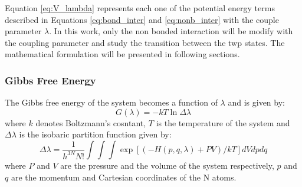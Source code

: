 Equation \ref{eq:V_lambda} represents each one of the potential energy terms described in Equations \ref{eq:bond_inter} and \ref{eq:nonb_inter} with the couple parameter $\lambda$.
In this work, only the non bonded interaction will be modify with the coupling parameter and study the transition between the twp states. The mathematical formulation will be presented in following sections. 

\subsubsection{Gibbs Free Energy}

The Gibbs free energy of the system becomes a function of $\lambda$ and is given by: 
\begin{equation}
    G(\lambda)=-kT\ln{\Delta \lambda}
    \label{eq:DG_general}
\end{equation}
where $k$ denotes Boltzmann's cosntant, $T$ is the temperature of the system and $\Delta \lambda$ is the isobaric partition function given by: 
\begin{equation}
    \Delta \lambda= \frac{1}{h^{3N}N!}\int\int\int\exp{[(-H(p,q,\lambda)+PV)/kT]}dVdpdq
    \label{eq:part_func}
\end{equation}
where $P$ and $V$ are the pressure and the volume of the system respectively, $p$ and $q$ are the momentum and Cartesian coordinates of the N atoms. 

